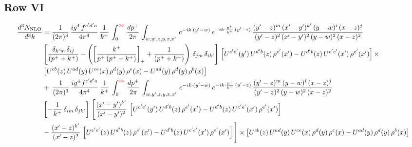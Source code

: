 \documentclass[9pt]{article}
\numberwithin{equation}{section}
\newcommand{\chg}[1]{{\color{red}#1}}
\begin{document}
\subsection{Row VI}
\begin{align}
    \frac{d^{3}N_{\rm NLO}}{d^{3}k} & =  \frac{1}{(2\pi)^{3}}\, \frac{ig^{4}\,f^{c'd'a}}{4\pi^{4}}\, \frac{1}{k^{+}}\,\int_{0}^{\chg{\infty}}\, \frac{dp^{+}}{2\pi}\, \int_{w,y',z,y,x,x'}\, e^{-ik\cdot (y'-w)}\, e^{-ik\cdot \frac{p^{+}}{k^{+}}\,(y'-z)}\,\frac{(y'-z)^{m}\,(x'-y')^{k'}\,(y-w)^{i}\,(x-z)^{j}}{(y'-z)^{2}\,(x'-y')^{2}\,(y-w)^{2}\,(x-z)^{2}}\notag \\ & \left[\frac{\delta_{k'm}\,\delta_{ij}}{(p^{+}+k^{+})}-\left(\left[\frac{k^{+}}{p^{+}\,(p^{+}+k^{+})}\right]_{+}+\frac{1}{(p^{+}+k^{+})}\right)\,\delta_{jm}\,\delta_{ik'}\right]\, \left[U^{c'e'}(y')\,U^{d'b}(z)\,\rho^{e'}(x')-U^{d'b}(z)\,U^{c'e'}(x')\,\rho^{e'}(x')\right]\times\notag \\ &  \left[U^{cb}(z)\,U^{ad}(y)\,U^{ce}(x)\,\rho^{d}(y)\,\rho^{e}(x)-U^{ad}(y)\,\rho^{d}(y)\,\rho^{b}(x)\right] \notag \\ &  +\,\frac{1}{(2\pi)^{3}}\, \frac{ig^{4}\,f^{c'd'a}}{4\pi^{4}}\, \frac{1}{k^{+}}\,\int_{0}^{\chg{\infty}}\, \frac{dp^{+}}{2\pi}\, \int_{w,y',z,y,x,x'}\, e^{-ik\cdot (y'-w)}\, e^{-ik\cdot \frac{p^{+}}{k^{+}}\,(y'-z)}\,\frac{(y'-z)^{m}\,(y-w)^{i}\,(x-z)^{j}}{(y'-z)^{2}\,(y-w)^{2}\,(x-z)^{2}}\notag \\ &  \left[-\frac{1}{k^{+}}\, \delta_{im}\, \delta_{jk'}\right]\, \Bigg[\frac{(x'-y')^{k'}}{(x'-y')^{2}}\,\left[U^{c'e'}(y')\,U^{d'b}(z)\,\rho^{e'}(x')-U^{d'b}(z)\,U^{c'e'}(x')\,\rho^{e'}(x')\right]\notag \\ & -\frac{(x'-z)^{k'}}{(x'-z)^{2}}\,\left[U^{c'e'}(z)\,U^{d'b}(z)\,\rho^{e'}(x')-U^{d'b}(z)\,U^{c'e'}(x')\,\rho^{e'}(x')\right]\Bigg]\times    \left[U^{cb}(z)\,U^{ad}(y)\,U^{ce}(x)\,\rho^{d}(y)\,\rho^{e}(x)-U^{ad}(y)\,\rho^{d}(y)\,\rho^{b}(x)\right]
\end{align}
\end{document}
